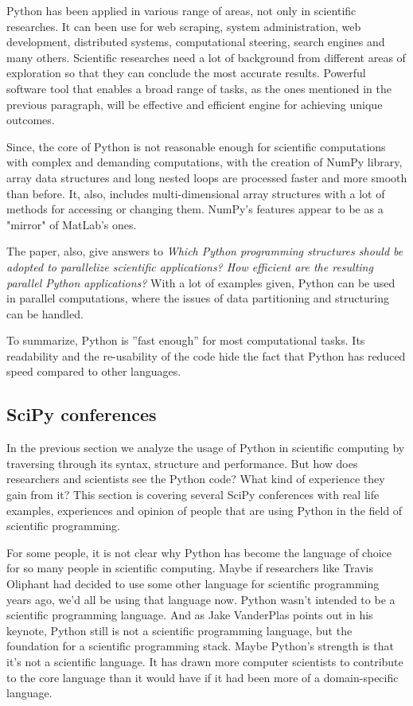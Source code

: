 \documentclass{article}
\begin{document}
Python has been applied in various range of areas, not only in scientific researches. It can been use for web scraping, system administration, web development, distributed systems, computational steering, search engines and many others. \cite{cai2005performance} Scientific researches need a lot of background from different areas of exploration so that they can conclude the most accurate results. Powerful software tool that enables a broad range of tasks, as the ones mentioned in the previous paragraph, will be effective and efficient engine for achieving unique outcomes. 

Since, the core of Python is not reasonable enough for scientific computations with complex and demanding computations, with the creation of NumPy library, array data structures and long nested loops are processed faster and more smooth than before. It, also, includes multi-dimensional array structures with a lot of methods for accessing or changing them. NumPy's features appear to be as a "mirror" of MatLab's ones. 

The paper, also, give answers to 
\textit{Which Python programming structures should be adopted to parallelize scientific applications? How efficient are the resulting parallel Python applications?} \cite{cai2005performance}
With a lot of examples given, Python can be used in parallel computations, where the issues of data partitioning and structuring can be handled. 

To summarize, Python is ”fast enough” for most computational tasks. Its readability and the re-usability of the code hide the fact that Python has reduced speed compared to other languages. 


\subsection{SciPy conferences \cite{johnSciPy}} 
\label{SciPy}

In the previous section we analyze the usage of Python in scientific computing by traversing through its syntax, structure and performance. But how does researchers and scientists see the Python code? What kind of experience they gain from it? This section is covering several SciPy conferences with real life examples, experiences and opinion of people that are using Python in the field of scientific programming.

For some people, it is not clear why Python has become the language of choice for so many people in scientific computing. Maybe if researchers like Travis Oliphant had decided to use some other language for scientific programming years ago, we’d all be using that language now. Python wasn’t intended to be a scientific programming language. And as Jake VanderPlas points out in his keynote, Python still is not a scientific programming language, but the foundation for a scientific programming stack. Maybe Python’s strength is that it’s not a scientific language. It has drawn more computer scientists to contribute to the core language than it would have if it had been more of a domain-specific language.
\end{document}
